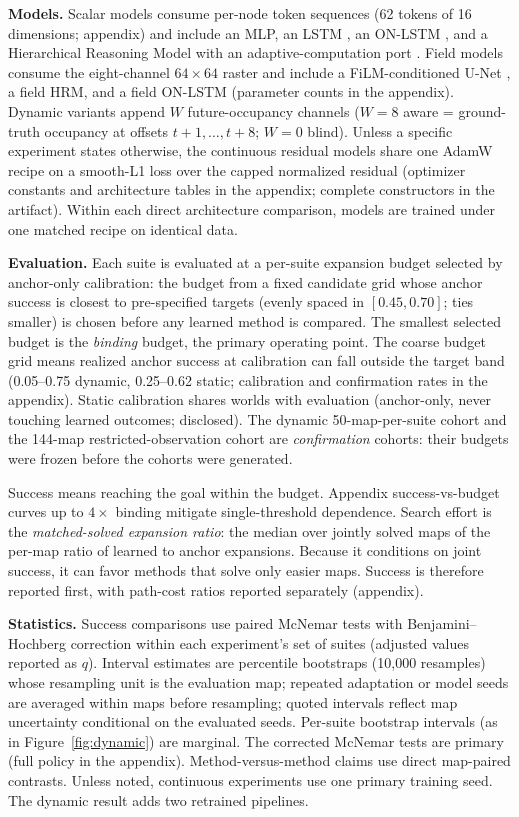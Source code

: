 \documentclass[letterpaper]{article} %
\begin{document}
\textbf{Models.} Scalar models consume per-node token sequences (62 tokens of 16 dimensions; appendix) and include an MLP, an LSTM \citep{hochreiter1997lstm}, an ON-LSTM \citep{shen2019onlstm}, and a Hierarchical Reasoning Model \citep[HRM;][]{wang2025hrm} with an adaptive-computation port \citep{graves2016act,banino2021pondernet}. Field models consume the eight-channel $64{\times}64$ raster and include a FiLM-conditioned U-Net \citep{ronneberger2015unet,perez2018film}, a field HRM, and a field ON-LSTM (parameter counts in the appendix). Dynamic variants append $W$ future-occupancy channels ($W{=}8$ aware = ground-truth occupancy at offsets $t{+}1,\ldots,t{+}8$; $W{=}0$ blind). Unless a specific experiment states otherwise, the continuous residual models share one AdamW recipe on a smooth-L1 loss over the capped normalized residual (optimizer constants and architecture tables in the appendix; complete constructors in the artifact). Within each direct architecture comparison, models are trained under one matched recipe on identical data.

\textbf{Evaluation.} Each suite is evaluated at a per-suite expansion budget selected by anchor-only calibration: the budget from a fixed candidate grid whose anchor success is closest to pre-specified targets (evenly spaced in $[0.45, 0.70]$; ties smaller) is chosen before any learned method is compared. The smallest selected budget is the \emph{binding} budget, the primary operating point. The coarse budget grid means realized anchor success at calibration can fall outside the target band (0.05--0.75 dynamic, 0.25--0.62 static; calibration and confirmation rates in the appendix). Static calibration shares worlds with evaluation (anchor-only, never touching learned outcomes; disclosed). The dynamic 50-map-per-suite cohort and the 144-map restricted-observation cohort are \emph{confirmation} cohorts: their budgets were frozen before the cohorts were generated.

Success means reaching the goal within the budget. Appendix success-vs-budget curves up to $4\times$ binding mitigate single-threshold dependence. Search effort is the \emph{matched-solved expansion ratio}: the median over jointly solved maps of the per-map ratio of learned to anchor expansions. Because it conditions on joint success, it can favor methods that solve only easier maps. Success is therefore reported first, with path-cost ratios reported separately (appendix).

\textbf{Statistics.} Success comparisons use paired McNemar tests with Benjamini--Hochberg correction within each experiment's set of suites (adjusted values reported as $q$). Interval estimates are percentile bootstraps (10{,}000 resamples) whose resampling unit is the evaluation map; repeated adaptation or model seeds are averaged within maps before resampling; quoted intervals reflect map uncertainty conditional on the evaluated seeds. Per-suite bootstrap intervals (as in Figure~\ref{fig:dynamic}) are marginal. The corrected McNemar tests are primary (full policy in the appendix). Method-versus-method claims use direct map-paired contrasts. Unless noted, continuous experiments use one primary training seed. The dynamic result adds two retrained pipelines.
\end{document}
